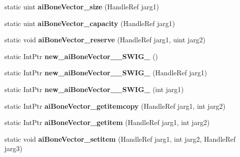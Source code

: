 \begin{DoxyCompactItemize}
\item 
\hypertarget{class_assimp_p_i_n_v_o_k_e_a8fc298f87b57493e22c1ca4a5196c8e4}{static uint {\bfseries ai\+Bone\+Vector\+\_\+size} (Handle\+Ref jarg1)}\label{class_assimp_p_i_n_v_o_k_e_a8fc298f87b57493e22c1ca4a5196c8e4}

\item 
\hypertarget{class_assimp_p_i_n_v_o_k_e_aa6334a3af6f3093ac6679e76ab19453c}{static uint {\bfseries ai\+Bone\+Vector\+\_\+capacity} (Handle\+Ref jarg1)}\label{class_assimp_p_i_n_v_o_k_e_aa6334a3af6f3093ac6679e76ab19453c}

\item 
\hypertarget{class_assimp_p_i_n_v_o_k_e_a663272abc6a4bca96d108381df6047d7}{static void {\bfseries ai\+Bone\+Vector\+\_\+reserve} (Handle\+Ref jarg1, uint jarg2)}\label{class_assimp_p_i_n_v_o_k_e_a663272abc6a4bca96d108381df6047d7}

\item 
\hypertarget{class_assimp_p_i_n_v_o_k_e_a541df509d9cee86e0cf1fd0c63c2f0a8}{static Int\+Ptr {\bfseries new\+\_\+ai\+Bone\+Vector\+\_\+\+\_\+\+S\+W\+I\+G\+\_} ()}\label{class_assimp_p_i_n_v_o_k_e_a541df509d9cee86e0cf1fd0c63c2f0a8}

\item 
\hypertarget{class_assimp_p_i_n_v_o_k_e_a8da87d20f2e09e61e82e7aa7be4885e2}{static Int\+Ptr {\bfseries new\+\_\+ai\+Bone\+Vector\+\_\+\+\_\+\+S\+W\+I\+G\+\_} (Handle\+Ref jarg1)}\label{class_assimp_p_i_n_v_o_k_e_a8da87d20f2e09e61e82e7aa7be4885e2}

\item 
\hypertarget{class_assimp_p_i_n_v_o_k_e_ab207eff6c2eedbf0d9bf9167e1fc201f}{static Int\+Ptr {\bfseries new\+\_\+ai\+Bone\+Vector\+\_\+\+\_\+\+S\+W\+I\+G\+\_} (int jarg1)}\label{class_assimp_p_i_n_v_o_k_e_ab207eff6c2eedbf0d9bf9167e1fc201f}

\item 
\hypertarget{class_assimp_p_i_n_v_o_k_e_a382be953ca3b10421a0678cb7a342cde}{static Int\+Ptr {\bfseries ai\+Bone\+Vector\+\_\+getitemcopy} (Handle\+Ref jarg1, int jarg2)}\label{class_assimp_p_i_n_v_o_k_e_a382be953ca3b10421a0678cb7a342cde}

\item 
\hypertarget{class_assimp_p_i_n_v_o_k_e_a0d4282f5a6842ed64f7ffc608223465d}{static Int\+Ptr {\bfseries ai\+Bone\+Vector\+\_\+getitem} (Handle\+Ref jarg1, int jarg2)}\label{class_assimp_p_i_n_v_o_k_e_a0d4282f5a6842ed64f7ffc608223465d}

\item 
\hypertarget{class_assimp_p_i_n_v_o_k_e_a216c10cd71b1395f32d3201af77ae728}{static void {\bfseries ai\+Bone\+Vector\+\_\+setitem} (Handle\+Ref jarg1, int jarg2, Handle\+Ref jarg3)}\label{class_assimp_p_i_n_v_o_k_e_a216c10cd71b1395f32d3201af77ae728}


\end{DoxyCompactItemize}
